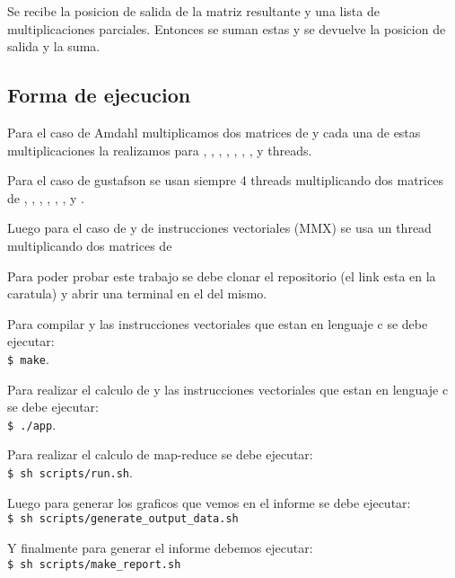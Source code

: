         Se recibe la posicion de salida de la matriz resultante y una lista de
        multiplicaciones parciales. Entonces se suman estas y se devuelve la
        posicion de salida y la suma.



\subsection{Forma de ejecucion}
    Para el caso de Amdahl multiplicamos dos matrices de  y cada
    una de estas multiplicaciones la realizamos para , ,
    , , , , ,  y 
    threads.

    \hfill \break
    Para el caso de gustafson se usan siempre 4 threads multiplicando dos matrices
    de , , , , ,
    , y .

    \hfill \break
    Luego para el caso de  y de instrucciones vectoriales (MMX)
    se usa un thread multiplicando dos matrices de 

    \hfill \break
    Para poder probar este trabajo se debe clonar el repositorio (el link esta
    en la caratula) y abrir una terminal en el  del mismo.

    \hfill \break
    Para compilar  y las instrucciones vectoriales que estan en
    lenguaje c se debe ejecutar: \\
    \lstinline[columns=fixed]{$ make}.

    \hfill \break
    Para realizar el calculo de   y las instrucciones vectoriales
    que estan en lenguaje c se debe ejecutar: \\
    \lstinline[columns=fixed]{$ ./app}.

    \hfill \break
    Para realizar el calculo de map-reduce se debe ejecutar: \\
    \lstinline[columns=fixed]{$ sh scripts/run.sh}.

    \hfill \break
    Luego para generar los graficos que vemos en el informe se debe
    ejecutar: \\
    \lstinline[columns=fixed]{$ sh scripts/generate_output_data.sh}

    \hfill \break
    Y finalmente para generar el informe debemos ejecutar: \\
    \lstinline[columns=fixed]{$ sh scripts/make_report.sh}

